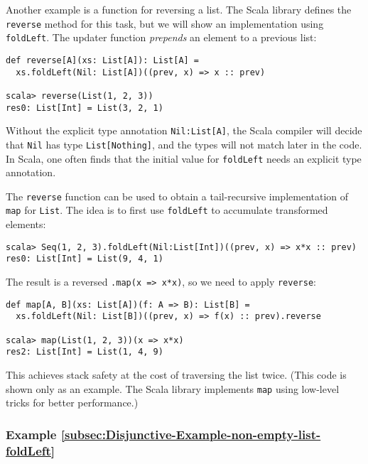 Another example is a function for reversing a list. The Scala library
defines the \lstinline!reverse! method for this task, but we will
show an implementation using \lstinline!foldLeft!. The updater function
\emph{prepends} an element to a previous list:
\begin{lstlisting}
def reverse[A](xs: List[A]): List[A] =
  xs.foldLeft(Nil: List[A])((prev, x) => x :: prev)

scala> reverse(List(1, 2, 3))
res0: List[Int] = List(3, 2, 1) 
\end{lstlisting}
Without the explicit type annotation \lstinline!Nil:List[A]!, the
Scala compiler will decide that \lstinline!Nil! has type \lstinline!List[Nothing]!,
and the types will not match later in the code. In Scala, one often
finds that the initial value for \lstinline!foldLeft! needs an explicit
type annotation.

The \lstinline!reverse! function can be used to obtain a tail-recursive
implementation of \lstinline!map! for \lstinline!List!. The idea
is to first use \lstinline!foldLeft! to accumulate transformed elements:
\begin{lstlisting}
scala> Seq(1, 2, 3).foldLeft(Nil:List[Int])((prev, x) => x*x :: prev)
res0: List[Int] = List(9, 4, 1)
\end{lstlisting}
The result is a reversed \lstinline!.map(x => x*x)!, so we need to
apply \lstinline!reverse!:
\begin{lstlisting}
def map[A, B](xs: List[A])(f: A => B): List[B] =
  xs.foldLeft(Nil: List[B])((prev, x) => f(x) :: prev).reverse

scala> map(List(1, 2, 3))(x => x*x)
res2: List[Int] = List(1, 4, 9)
\end{lstlisting}
This achieves stack safety at the cost of traversing the list twice.
(This code is shown only as an example. The Scala library implements
\lstinline!map! using low-level tricks for better performance.)

\subsubsection{Example \label{subsec:Disjunctive-Example-non-empty-list-foldLeft}\ref{subsec:Disjunctive-Example-non-empty-list-foldLeft}}

